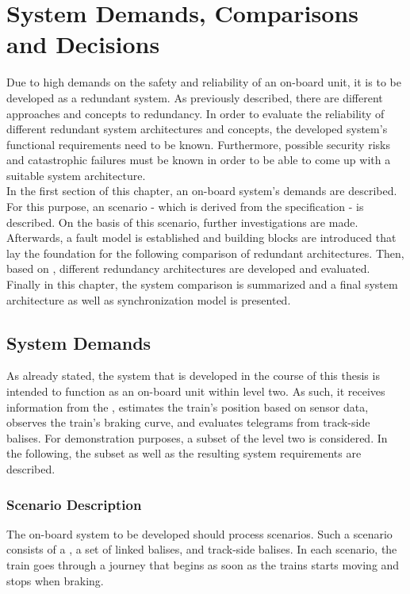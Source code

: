 \chapter{System Demands, Comparisons and Decisions}
\label{chptr:redundantSystemsCompare}
Due to high demands on the safety and reliability of an on-board unit, it is to be developed as a redundant system.
As previously described, there are different approaches and concepts to redundancy.
In order to evaluate the reliability of different redundant system architectures and concepts, the developed system's functional requirements need to be known.
Furthermore, possible security risks and catastrophic failures must be known in order to be able to come up with a suitable system architecture.
\\

In the first section of this chapter, an  on-board system's demands are described.
For this purpose, an  scenario - which is derived from the  specification - is described.
On the basis of this scenario, further investigations are made.
Afterwards, a fault model is established and  building blocks are introduced that lay the foundation for the following comparison of redundant architectures.
Then, based on , different redundancy architectures are developed and evaluated.
Finally in this chapter, the system comparison is summarized and a final system architecture as well as synchronization model is presented.

\section{System Demands}
As already stated, the system that is developed in the course of this thesis is intended to function as an on-board unit within  level two.
As such, it receives information from the , estimates the train's position based on sensor data, observes the train's braking curve, and evaluates telegrams from track-side balises.
For demonstration purposes, a subset of the  level two is considered.
In the following, the  subset as well as the resulting system requirements are described.

\subsection{Scenario Description}
\label{sec:ScenarioDescription}

The on-board system to be developed should process  scenarios.
Such a scenario consists of a , a set of linked balises, and track-side balises.
In each scenario, the train goes through a journey that begins as soon as the trains starts moving and stops when braking.
\\

